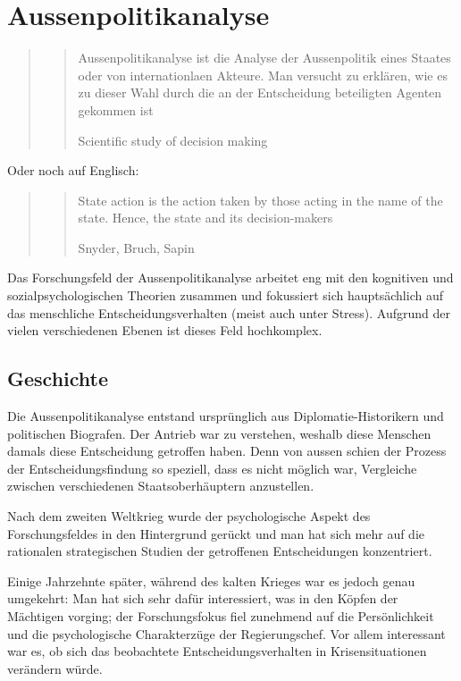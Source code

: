 \documentclass[a4paper, 11pt]{article}
\begin{document}
\section{Aussenpolitikanalyse}

\begin{quote}
	\blockquote[Scientific study of decision making]{Aussenpolitikanalyse ist die Analyse der Aussenpolitik eines Staates oder von internationlaen Akteure. Man versucht zu erklären, wie es zu dieser Wahl durch die an der Entscheidung beteiligten Agenten gekommen ist}
\end{quote}

\noindent Oder noch auf Englisch:

\begin{quote}
	\blockquote[Snyder, Bruch, Sapin]{State action is the action taken by those acting in the name of the state. Hence, the state and its decision-makers}
\end{quote}

Das Forschungsfeld der Aussenpolitikanalyse arbeitet eng mit den kognitiven und sozialpsychologischen Theorien zusammen und fokussiert sich hauptsächlich auf das menschliche Entscheidungsverhalten (meist auch unter Stress). Aufgrund der vielen verschiedenen Ebenen ist dieses Feld hochkomplex.

\vspace{10px}

\subsection{Geschichte}

Die Aussenpolitikanalyse entstand ursprünglich aus Diplomatie-Historikern und politischen Biografen. Der Antrieb war zu verstehen, weshalb diese Menschen damals diese Entscheidung getroffen haben. Denn von aussen schien der Prozess der Entscheidungsfindung so speziell, dass es nicht möglich war, Vergleiche zwischen verschiedenen Staatsoberhäuptern anzustellen.

Nach dem zweiten Weltkrieg wurde der psychologische Aspekt des Forschungsfeldes in den Hintergrund gerückt und man hat sich mehr auf die rationalen strategischen Studien der getroffenen Entscheidungen konzentriert.

Einige Jahrzehnte später, während des kalten Krieges war es jedoch genau umgekehrt: Man hat sich sehr dafür interessiert, was in den Köpfen der Mächtigen vorging; der Forschungsfokus fiel zunehmend auf die Persönlichkeit und die psychologische Charakterzüge der Regierungschef. Vor allem interessant war es, ob sich das beobachtete Entscheidungsverhalten in Krisensituationen verändern würde.
\end{document}
